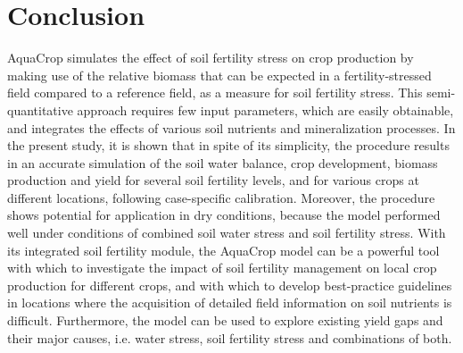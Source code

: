 \section{Conclusion}
AquaCrop simulates the effect of soil fertility stress on crop production by making use of the relative biomass that can be expected in a fertility-stressed field compared to a reference field, as a measure for soil fertility stress. This semi-quantitative approach requires few input parameters, which are easily obtainable, and integrates the effects of various soil nutrients and mineralization processes. In the present study, it is shown that in spite of its simplicity, the procedure results in an accurate simulation of the soil water balance, crop development, biomass production and yield for several soil fertility levels, and for various crops at different locations, following case-specific calibration. Moreover, the procedure shows potential for application in dry conditions, because the model performed well under conditions of combined soil water stress and soil fertility stress. With its integrated soil fertility module, the AquaCrop model can be a powerful tool with which to investigate the impact of soil fertility management on local crop production for different crops, and with which to develop best-practice guidelines in locations where the acquisition of detailed field information on soil nutrients is difficult. Furthermore, the model can be used to explore existing yield gaps and their major causes, i.e. water stress, soil fertility stress and combinations of both.



\cleardoublepage